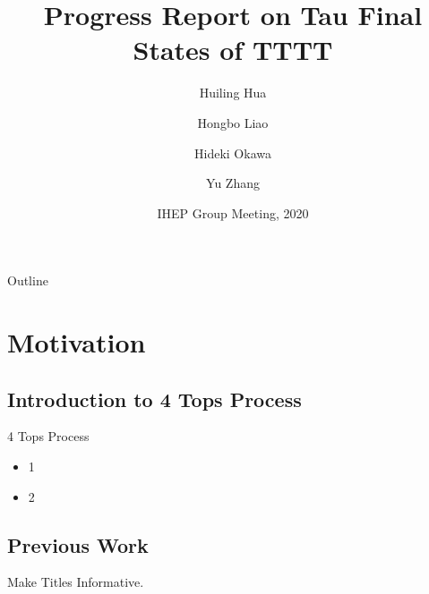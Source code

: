 \documentclass{beamer}
\title[IHEP Group Meeting] %
{Progress Report on Tau Final States of TTTT}
\author[Huiling Hua] %
{Huiling Hua\inst{1} \and Hongbo Liao\inst{1} \and Hideki Okawa\inst{2} \and Yu    Zhang\inst{2}}
\institute[IHEP] %
{
  \inst{1}%
    IHEP
  \and
  \inst{2}%
    Fudan University
}
\date[IHEP 2020] %
{IHEP Group Meeting, 2020}
\begin{document}
\begin{frame}
  \titlepage
\end{frame}

\begin{frame}{Outline}
  \tableofcontents
\end{frame}





\section{Motivation}
\subsection{Introduction to 4 Tops Process}

\begin{frame}{4 Tops Process}%
  \begin{itemize}
  \item
    1%
  \item
    2%
  \end{itemize}
\end{frame}


\subsection{Previous Work}
\begin{frame}{Make Titles Informative.}
\end{frame}
\end{document}
